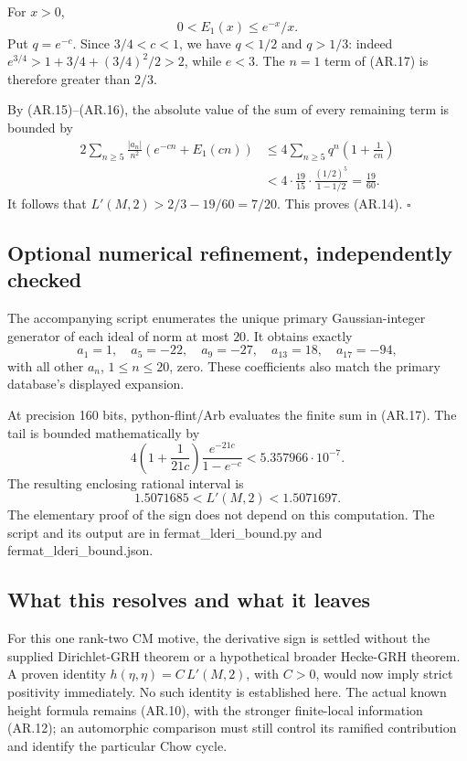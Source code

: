 \documentclass[11pt,a4paper]{article}
\begin{document}
For \(x>0\), \[
0<E_1(x)\le e^{-x}/x.
\] Put \(q=e^{-c}\). Since \(3/4<c<1\), we have \(q<1/2\) and \(q>1/3\):
indeed \(e^{3/4}>1+3/4+(3/4)^2/2>2\), while \(e<3\). The \(n=1\) term of
(AR.17) is therefore greater than \(2/3\).

By (AR.15)--(AR.16), the absolute value of the sum of every remaining
term is bounded by \[
\begin{aligned}
2\sum_{n\ge5}\frac{|a_n|}{n^2}
       \left(e^{-cn}+E_1(cn)\right)
&\le4\sum_{n\ge5}q^n\left(1+\frac1{cn}\right)\\
&<4\cdot\frac{19}{15}\cdot
       \frac{(1/2)^5}{1-1/2}
 =\frac{19}{60}.
\end{aligned}
\] It follows that \(L'(M,2)>2/3-19/60=7/20\). This proves (AR.14).
\(\square\)

\subsection{Optional numerical refinement, independently
checked}\label{optional-numerical-refinement-independently-checked}

The accompanying script enumerates the unique primary Gaussian-integer
generator of each ideal of norm at most \(20\). It obtains exactly \[
a_1=1,\quad a_5=-22,\quad a_9=-27,\quad a_{13}=18,\quad a_{17}=-94,
\] with all other \(a_n\), \(1\le n\le20\), zero. These coefficients
also match the primary database's displayed expansion.

At precision 160 bits, python-flint/Arb evaluates the finite sum in
(AR.17). The tail is bounded mathematically by \[
4\left(1+\frac1{21c}\right)\frac{e^{-21c}}{1-e^{-c}}
 <5.357966\cdot10^{-7}.
\] The resulting enclosing rational interval is \[
1.5071685<L'(M,2)<1.5071697.
\tag{AR.18}
\] The elementary proof of the sign does not depend on this computation.
The script and its output are in fermat\_lderi\_bound.py and
fermat\_lderi\_bound.json.

\subsection{What this resolves and what it
leaves}\label{what-this-resolves-and-what-it-leaves}

For this one rank-two CM motive, the derivative sign is settled without
the supplied Dirichlet-GRH theorem or a hypothetical broader Hecke-GRH
theorem. A proven identity \(h(\eta,\eta)=C\,L'(M,2)\), with \(C>0\),
would now imply strict positivity immediately. No such identity is
established here. The actual known height formula remains (AR.10), with
the stronger finite-local information (AR.12); an automorphic comparison
must still control its ramified contribution and identify the particular
Chow cycle.
\end{document}
